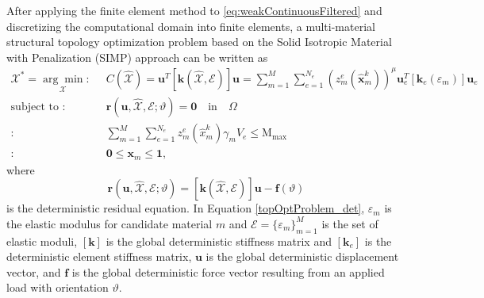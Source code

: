 After applying the finite element method \cite{hughes2012finite} to \eqref{eq:weakContinuousFiltered} and discretizing the computational domain into finite elements, a multi-material structural topology optimization problem based on the Solid Isotropic Material with Penalization (SIMP) \cite{bendsoe2013topology,bendsoe1995optimization} approach can be written as
\begin{equation}
\begin{aligned}
\label{topOptProblem_det}
\mathcal{X}^{\ast}=\underset{\mathcal{X}}{\arg\min}: & \;\; C(\widehat{\mathcal{X}}) = \bm{u}^T [\bm{k}(\widehat{\mathcal{X}},\mathcal{E})] \bm{u} = \sum_{m=1}^M\sum_{e=1}^{N_e} (z_m^e(\hat{\bm{x}}_m^k))^{\mu} \bm{u}_e^T [\bm{k}_e(\varepsilon_m)] \bm{u}_e \\
\text{subject to } : & \;\;  \bm r (\bm u,\widehat{\mathcal{X}},\mathcal{E};\vartheta) = \bm 0 \quad\mbox{in}\quad\Omega \\
			 :  & \;\;  \sum_{m=1}^{M}\sum_{e=1}^{N_e}z_m^e(\hat{x}_m^k)\gamma_m V_e \leq \mathrm{M}_{\max} \\
			 : & \;\; \bm 0 \leq \bm x_m \leq \bm 1,
\end{aligned} 
\end{equation}
where
\begin{equation}
\bm r (\bm u, \widehat{\mathcal{X}}, \mathcal{E}; \vartheta) = [\bm k(\widehat{\mathcal{X}},\mathcal{E})] \bm u - \bm f(\vartheta)\label{deterministic_model}
\end{equation}
is the deterministic residual equation. In Equation \eqref{topOptProblem_det}, $\varepsilon_m$ is the elastic modulus for candidate material $m$ and $\mathcal{E}=\{\varepsilon_{m}\}_{m=1}^M$ is the set of elastic moduli, $[\bm k]$ is the global deterministic stiffness matrix and $[\bm k_e]$ is the deterministic element stiffness matrix, $\bm u$ is the global deterministic displacement vector, and $\bm f$ is the global deterministic force vector resulting from an applied load with orientation $\vartheta$.\\

